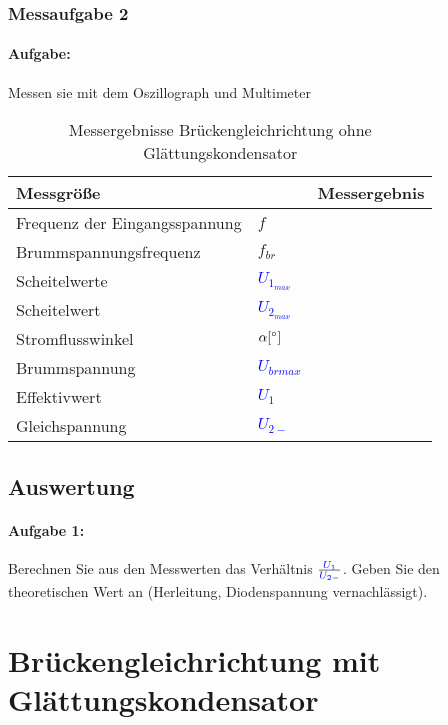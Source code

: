 \documentclass[11pt,a4paper,titlepage]{scrreprt}
\newcommand{\spannung}[1]{\textcolor{blue}{#1}}
\begin{document}
			
			\subsubsection{Messaufgabe 2}
			\paragraph{Aufgabe:} Messen sie mit dem Oszillograph und Multimeter
			\begin{table}[!hbtp]
				\caption{Messergebnisse Brückengleichrichtung ohne Glättungskondensator}
				\label{tbl:messergebnisse2.1}
				\renewcommand{\arraystretch}{1.3}
				\begin{tabular}{ll|l}
					\multicolumn{2}{l}{\textbf{Messgröße}} & \textbf{Messergebnis}\\ \hline
					Frequenz der Eingangsspannung & $f$ & \\
					Brummspannungsfrequenz & $f_{br}$ & \\
					Scheitelwerte & \spannung{$U_{1_{max}}$} & \\
					Scheitelwert & \spannung{$U_{2_{max}}$} &\\
					Stromflusswinkel &  $\alpha [ \degree]$& \\
					Brummspannung &  \spannung{$U_{brmax}$} &\\ \hline
					Effektivwert & \spannung{$U_{1}$} &\\
					Gleichspannung & \spannung{$U_{2-}$} & \\
				\end{tabular}
			\end{table}
			\subsection{Auswertung}
			\paragraph{Aufgabe 1:} Berechnen Sie aus den Messwerten das Verhältnis $\frac{\spannung{U_1}}{\spannung{U_{2-}}}$. Geben Sie den theoretischen Wert an (Herleitung, Diodenspannung vernachlässigt).\\
		 \pagebreak
		\section{Brückengleichrichtung mit Glättungskondensator}
\end{document}
